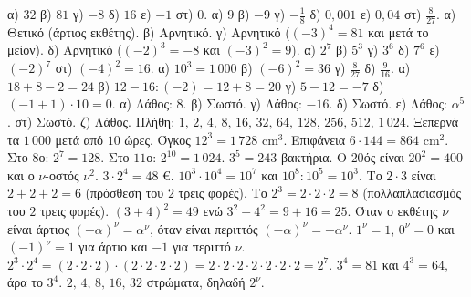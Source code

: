  α) $32$ \quad β) $81$ \quad γ) $-8$ \quad δ) $16$ \quad ε) $-1$ \quad στ) $0$.
 α) $9$ \quad β) $-9$ \quad γ) $-\frac{1}{8}$ \quad δ) $0{,}001$ \quad ε) $0{,}04$ \quad στ) $\frac{8}{27}$.
 α) Θετικό (άρτιος εκθέτης). β) Αρνητικό. γ) Αρνητικό ($(-3)^4=81$ και μετά το μείον). δ) Αρνητικό ($(-2)^3=-8$ και $(-3)^2=9$).
 α) $2^7$ \quad β) $5^3$ \quad γ) $3^6$ \quad δ) $7^6$ \quad ε) $(-2)^7$ \quad στ) $(-4)^2=16$.
 α) $10^3=1\,000$ \quad β) $(-6)^2=36$ \quad γ) $\frac{8}{27}$ \quad δ) $\frac{9}{16}$.
 α) $18+8-2=24$ \quad β) $12-16:(-2)=12+8=20$ \quad γ) $5-12=-7$ \quad δ) $(-1+1)\cdot10=0$.
 α) Λάθος: $8$. β) Σωστό. γ) Λάθος: $-16$. δ) Σωστό. ε) Λάθος: $\alpha^5$. στ) Σωστό. ζ) Λάθος.
 Πλήθη: $1,\,2,\,4,\,8,\,16,\,32,\,64,\,128,\,256,\,512,\,1\,024$. Ξεπερνά τα $1\,000$ μετά από $10$ ώρες.
 Όγκος $12^3=1\,728$ cm$^3$. Επιφάνεια $6\cdot144=864$ cm$^2$.
 Στο $8$ο: $2^7=128$. Στο $11$ο: $2^{10}=1\,024$.
 $3^5=243$ βακτήρια.
 Ο $20$ός είναι $20^2=400$ και ο $\nu$-οστός $\nu^2$.
 $3\cdot2^4=48$ €.
 $10^3\cdot10^4=10^7$ και $10^8:10^5=10^3$.
 Το $2\cdot3$ είναι $2+2+2=6$ (πρόσθεση του $2$ τρεις φορές). Το $2^3=2\cdot2\cdot2=8$ (πολλαπλασιασμός του $2$ τρεις φορές).
 $(3+4)^2=49$ ενώ $3^2+4^2=9+16=25$.
 Όταν ο εκθέτης $\nu$ είναι άρτιος $(-\alpha)^\nu=\alpha^\nu$, όταν είναι περιττός $(-\alpha)^\nu=-\alpha^\nu$.
 $1^\nu=1$, $0^\nu=0$ και $(-1)^\nu=1$ για άρτιο και $-1$ για περιττό $\nu$.
 $2^3\cdot2^4=(2\cdot2\cdot2)\cdot(2\cdot2\cdot2\cdot2)=2\cdot2\cdot2\cdot2\cdot2\cdot2\cdot2=2^7$.
 $3^4=81$ και $4^3=64$, άρα το $3^4$.
 $2,\,4,\,8,\,16,\,32$ στρώματα, δηλαδή $2^\nu$.

